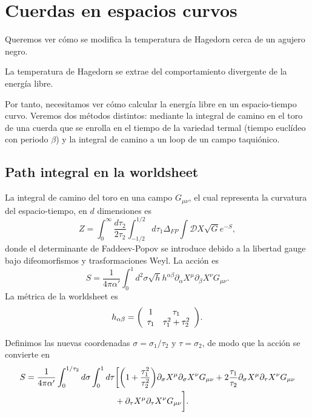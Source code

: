 \chapter{Cuerdas en espacios curvos}

Queremos ver cómo se modifica la temperatura de Hagedorn cerca de un agujero negro.

La temperatura de Hagedorn se extrae del comportamiento divergente de la energía libre.


Por tanto, necesitamos ver cómo calcular la energía libre en un espacio-tiempo curvo.
Veremos dos métodos distintos: mediante la integral de camino en el toro de una cuerda
que se enrolla en el tiempo de la variedad termal (tiempo euclídeo con periodo $\beta$) y
la integral de camino a un loop de un campo taquiónico.

\section{Path integral en la worldsheet}

La integral de camino del toro en una campo $G_{\mu\nu}$, el cual representa la curvatura
del espacio-tiempo, en $d$ dimensiones es
\begin{equation}
  Z=\int_0^\infty \frac{d\tau_2}{2\tau_2} \int_{-1/2}^{1/2} d\tau_1 \Delta_{FP} \int \mathcal DX
  \sqrt G e^{-S},
  \label{eq:toruspi}
\end{equation}
donde el determinante de Faddeev-Popov se introduce debido a la libertad gauge bajo difeomorfismos
y trasformaciones Weyl.
La acción es 
\begin{equation}
  S= \frac{1}{4\pi \alpha'}\int_{0}^{1} d^2\sigma \sqrt h h^{\alpha\beta} \partial_\alpha X^\mu\partial_\beta X^\nu G_{\mu\nu}.
\end{equation}
La métrica de la worldsheet es
\begin{equation}
  h_{\alpha\beta} =
\qty(
\begin{array}{cc}
  1 & \tau_1 \\
  \tau_1 & \tau_1^2+\tau_2^2
\end{array}
).
\end{equation}

Definimos las nuevas coordenadas $\sigma=\sigma_1/\tau_2$ y $\tau=\sigma_2$, de modo 
que la acción se convierte en 
\begin{equation}
  \begin{aligned}
    S= \frac{1}{4\pi \alpha'}\int_0^{1/\tau_2} d\sigma  \int_0^1 d\tau 
    &\biggl[
      \qty(1+\frac{\tau_1^2}{\tau^2_2})\partial_\sigma X^\mu \partial_\sigma X^\nu G_{\mu\nu} +
      2\frac{\tau_1}{\tau_2}\partial_\sigma X^\mu \partial_\tau X^\nu G_{\mu\nu}  \\
      &+ \partial_\tau X^\mu \partial_\tau X^\nu G_{\mu\nu}\biggl].
  \end{aligned}
\end{equation}

